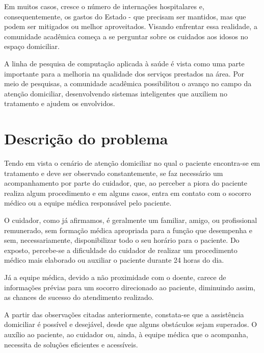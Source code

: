 Em muitos casos, cresce o número de internações hospitalares e,
consequentemente, os gastos do Estado - que precisam ser mantidos, mas que
podem ser mitigados ou melhor aproveitados.  Visando enfrentar essa realidade,
a comunidade acadêmica começa a se perguntar sobre os cuidados aos idosos no
espaço domiciliar.

A linha de pesquisa de computação aplicada à saúde é vista como uma parte
importante para a melhoria na qualidade dos serviços prestados na área. Por meio
de pesquisas, a comunidade acadêmica possibilitou o avanço no campo da atenção
domiciliar, desenvolvendo sistemas inteligentes que auxiliem no tratamento e
ajudem os envolvidos.

\section{Descrição do problema}\label{sec:descricao-problema}

Tendo em vista o cenário de atenção domiciliar no qual o paciente
encontra-se em tratamento e deve ser observado constantemente, 
se faz necessário um acompanhamento por parte do cuidador, que, ao perceber 
a piora do paciente realiza algum procedimento e em alguns casos, entra 
em contato com o socorro médico ou a equipe médica responsável pelo paciente.

O cuidador, como já afirmamos, é geralmente um familiar, amigo, ou profissional
remunerado, sem formação médica apropriada para a função que desempenha  e sem,
necessariamente, disponibilizar todo o seu horário para o paciente. Do exposto,
percebe-se a dificuldade do cuidador de realizar um procedimento médico mais
elaborado ou auxiliar o paciente durante 24 horas do dia.

Já a equipe médica, devido a não proximidade com o doente, carece de informações
prévias para um socorro direcionado ao paciente, diminuindo assim, as chances de
sucesso do atendimento realizado.


A partir das observações citadas anteriormente, constata-se que a assistência
domiciliar é possível e desejável, desde que alguns obstáculos sejam superados.
O auxílio ao paciente, ao cuidador ou, ainda, à equipe médica que o
acompanha, necessita de soluções eficientes e acessíveis.

